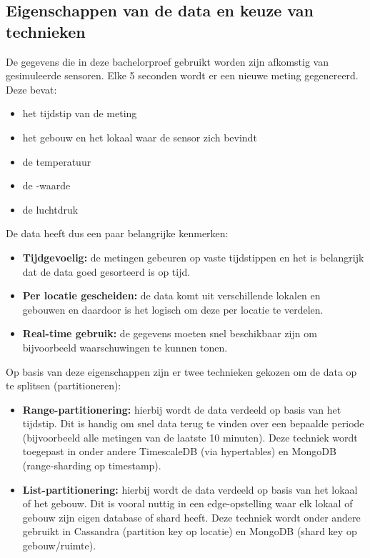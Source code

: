 \subsection{Eigenschappen van de data en keuze van technieken}

De gegevens die in deze bachelorproef gebruikt worden zijn afkomstig van gesimuleerde sensoren. Elke 5 seconden wordt er een nieuwe meting gegenereerd. \\

Deze bevat:
\begin{itemize}
    \item het tijdstip van de meting
    \item het gebouw en het lokaal waar de sensor zich bevindt
    \item de temperatuur
    \item de -waarde
    \item de luchtdruk
\end{itemize}

De data heeft dus een paar belangrijke kenmerken:
\begin{itemize}
    \item \textbf{Tijdgevoelig:} de metingen gebeuren op vaste tijdstippen en het is belangrijk dat de data goed gesorteerd is op tijd.
    \item \textbf{Per locatie gescheiden:} de data komt uit verschillende lokalen en gebouwen en daardoor is het logisch om deze per locatie te verdelen.
    \item \textbf{Real-time gebruik:} de gegevens moeten snel beschikbaar zijn om bijvoorbeeld waarschuwingen te kunnen tonen.\\
\end{itemize}

Op basis van deze eigenschappen zijn er twee technieken gekozen om de data op te splitsen (partitioneren):

\begin{itemize}
    \item \textbf{Range-partitionering:} hierbij wordt de data verdeeld op basis van het tijdstip. Dit is handig om snel data terug te vinden over een bepaalde periode (bijvoorbeeld alle metingen van de laatste 10 minuten). Deze techniek wordt toegepast in onder andere TimescaleDB (via hypertables) en MongoDB (range-sharding op timestamp).

    \item \textbf{List-partitionering:} hierbij wordt de data verdeeld op basis van het lokaal of het gebouw. Dit is vooral nuttig in een edge-opstelling waar elk lokaal of gebouw zijn eigen database of shard heeft. Deze techniek wordt onder andere gebruikt in Cassandra (partition key op locatie) en MongoDB (shard key op gebouw/ruimte).
\end{itemize}

